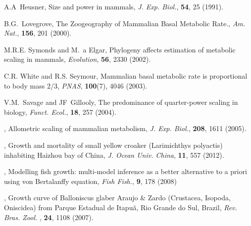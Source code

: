 \begin{thebibliography}{100}
 A.A~Heusner, {Size and power in mammals}, \textit{ J. Exp. Biol.}, \textbf{54}, 25 (1991).

 B.G.~Lovegrove, {The Zoogeography of Mammalian Basal Metabolic Rate.}, \textit{Am. Nat.}, \textbf{156}, 201 (2000).

 M.R.E. Symonds and M.~a Elgar, {Phylogeny affects estimation of metabolic scaling in mammals}, \textit{Evolution}, \textbf{56}, 2330 (2002).

 C.R. White and R.S. Seymour, {Mammalian basal metabolic rate is proportional to body mass $2/3$}, \textit{PNAS}, \textbf{100}(7), 4046 (2003).

 V.M.~Savage and JF~Gillooly, {The predominance of quarter-power scaling in biology}, \textit{Funct. Ecol.}, \textbf{18}, 257 (2004).


, {Allometric scaling of mammalian metabolism}, \textit{J. Exp. Biol.}, \textbf{208}, {1611} {(2005)}.

, {Growth and mortality of small yellow croaker (Larimichthys polyactis) inhabiting Haizhou bay of China}, \textit{J. Ocean Univ. China}, \textbf{11}, {557} {(2012)}.


, {Modelling fish growth: multi-model inference as a better alternative to a priori using von Bertalanffy equation}, \textit{Fish Fish.}, \textbf{9}, {178} {(2008)}

, {Growth curve of Balloniscus glaber Araujo \& Zardo (Crustacea, Isopoda, Oniscidea) from Parque Estadual de Itapuã, Rio Grande do Sul, Brazil}, \textit{Rev. Bras. Zool. }, \textbf{24}, {1108} {(2007)}.



\end{thebibliography}
